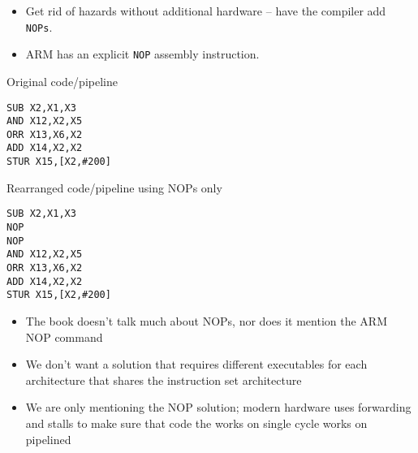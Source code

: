 \begin{frame}[fragile]
\begin{itemize}
    \item Get rid of hazards without additional hardware -- have the compiler add {\tt NOPs}.
    \item ARM has an explicit {\tt NOP} assembly instruction.
\end{itemize}
{\tiny
\begin{multicols}{2}
Original code/pipeline
\begin{verbatim}
SUB X2,X1,X3            
AND X12,X2,X5          
ORR X13,X6,X2           
ADD X14,X2,X2           
STUR X15,[X2,#200]      
\end{verbatim}
    \columnbreak
    Rearranged code/pipeline using NOPs only
\begin{verbatim}
SUB X2,X1,X3
NOP
NOP
AND X12,X2,X5
ORR X13,X6,X2
ADD X14,X2,X2
STUR X15,[X2,#200]
\end{verbatim}
\end{multicols}}

\BNotes\ifnum{}
\begin{itemize}
\item The book doesn't talk much about NOPs, nor does it mention the ARM NOP command
\item We don't want a solution that requires different executables for each
  architecture that shares the instruction set architecture
\item We are only mentioning the NOP solution; modern hardware uses forwarding and stalls to make sure that code the works on single cycle works on pipelined
\end{itemize}
\fi\ENotes
\end{frame}

